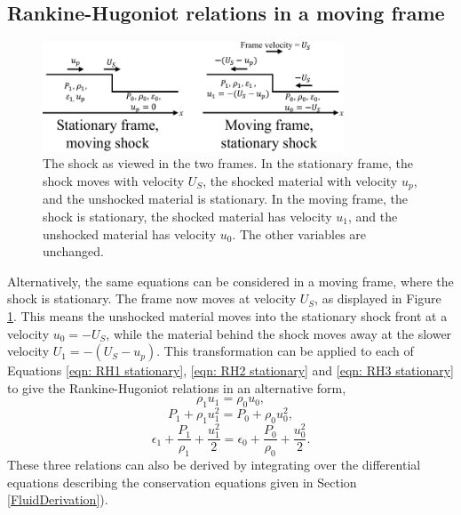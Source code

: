 \subsection{Rankine-Hugoniot relations in a moving frame}

\begin{figure}
\centering
\includegraphics[width=0.8\textwidth]{figures/Theory/ReferenceFrames.pdf}%
\caption{\label{fig:ReferenceFrames} The shock as viewed in the two frames. In the stationary frame, the shock moves with velocity $U_S$, the shocked material with velocity $u_p$, and the unshocked material is stationary. In the moving frame, the shock is stationary, the shocked material has velocity $u_1$, and the unshocked material has velocity $u_0$. The other variables are unchanged.}
\end{figure}

Alternatively, the same equations can be considered in a moving frame, where the shock is stationary. The frame now moves at velocity $U_S$, as displayed in Figure \ref{fig:ReferenceFrames}. This means the unshocked material moves into the stationary shock front at a velocity $u_0 = -U_S$, while the material behind the shock moves away at the slower velocity $U_1 = -(U_S - u_p)$. This transformation can be applied to each of Equations \ref{eqn: RH1 stationary}, \ref{eqn: RH2 stationary} and \ref{eqn: RH3 stationary} to give the Rankine-Hugoniot relations in an alternative form,
\begin{equation} \rho_1 u_1 = \rho_0 u_0, \label{eqn: RH1 moving} \end{equation}
\begin{equation} P_1 + \rho_1 u_1^2 = P_0 + \rho_0 u_0^2, \label{eqn: RH2 moving} \end{equation}
\begin{equation} \epsilon_1 + \frac{P_1}{\rho_1} + \frac{u_1^2}{2} = \epsilon_0 + \frac{P_0}{\rho_0} + \frac{u_0^2}{2}. \label{eqn: RH3 moving} \end{equation}
These three relations can also be derived by integrating over the differential equations describing the conservation equations given in Section \ref{FluidDerivation}).

